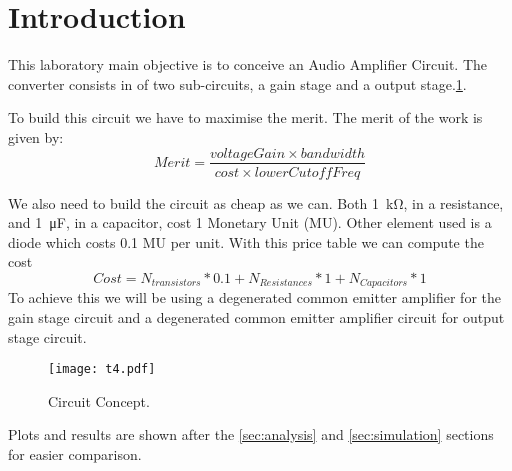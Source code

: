 \section{Introduction}

This laboratory main objective is to conceive an Audio Amplifier Circuit. The converter consists in of two sub-circuits, a gain stage and a output stage.\ref{Fig1: circuit}.

To build this circuit we have to maximise the merit. The merit of the work is given by:
\begin{equation}
    Merit = \dfrac{voltageGain \times bandwidth}{cost \times lowerCutoffFreq}
\end{equation}

We also need to build the circuit as cheap as we can. Both \SI{1}{\kilo\ohm}, in a resistance, and \SI{1}{\micro\farad}, in a capacitor, cost 1 Monetary Unit (MU). Other element used is a diode which costs 0.1 MU per unit.
With this price table we can compute the cost
\begin{equation}
    Cost = N_{transistors}*0.1+N_{Resistances}*1+N_{Capacitors}*1
\end{equation}
To achieve this we will be using a degenerated common emitter amplifier for the gain stage circuit and a degenerated common emitter amplifier circuit for output stage circuit.

\begin{figure}[h] 
\centering
\texttt{[image: t4.pdf]}
\caption{Circuit Concept.}
\label{Fig1: circuit}
\end{figure}

Plots and results are shown after the \ref{sec:analysis} and \ref{sec:simulation} sections for easier comparison.
